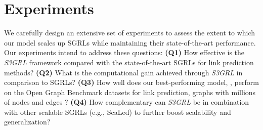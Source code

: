 \documentclass[sigconf, nonacm]{acmart}
\newcommand{\posplus}{\xspace}
\newcommand{\ssgrl}{\textit{S3GRL}\xspace}
\newcommand{\scaled}{S\lowercase{ca}L\lowercase{ed}\xspace}
\begin{document}
\section{Experiments}
We carefully design an extensive set of experiments to assess the extent to which our model scales up SGRLs while maintaining their state-of-the-art performance. 
Our experiments intend to address these questions: \textbf{(Q1)} How effective is the \ssgrl framework compared with the state-of-the-art SGRLs for link prediction methods? \textbf{(Q2)} What is the computational gain achieved through \ssgrl in comparison to SGRLs? \textbf{(Q3)} How well does our best-performing model, \posplus, perform on the Open Graph Benchmark datasets for link prediction, graphs with millions of nodes and edges \cite{hu2020ogb,hu2021ogb}? \textbf{(Q4)} How complementary can \ssgrl be in combination with other scalable SGRLs (e.g., \scaled \cite{louis2022sampling}) to further boost scalability and generalization? 
\end{document}
